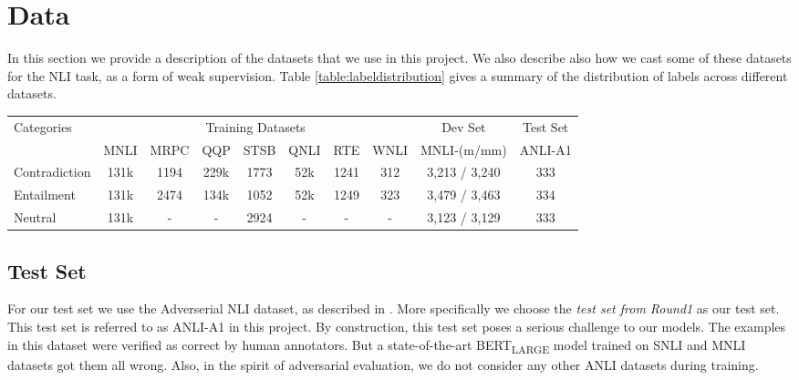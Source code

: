 \section{Data}
\label{sec:data}


In this section we provide a description of the datasets that we use in this project. We also describe also how we cast some of these datasets for the NLI task, as a form of weak supervision. Table \ref{table:labeldistribution} gives a summary of the distribution of labels across different datasets.

\begin{table*}
\small
\centering
\begin{tabular}{l ccccccc | c c}

\toprule
Categories
                                        & \multicolumn{7}{c|}{Training Datasets} 
                                        & \multicolumn{1}{c}{Dev Set}   
                                        & \multicolumn{1}{c}{Test Set} \\ 
                                        
																				& MNLI      & MRPC  	& QQP				&STSB				&QNLI    		& RTE				& WNLI   	& MNLI-(m/mm)   	& ANLI-A1  \\
\midrule

Contradiction														& 131k			& 1194 		& 229k 			& 1773			& 52k 			& 1241			& 312			& 3,213 / 3,240   & 333 \\
Entailment   								 		    		& 131k  		& 2474 		& 134k 			& 1052			& 52k				& 1249			& 323			& 3,479 / 3,463   & 334 \\
Neutral    															& 131k  		& - 			& - 				& 2924			& -					& -					& -				& 3,123 / 3,129   & 333 \\

\bottomrule
\end{tabular}

\caption{\label{table:labeldistribution} Distribution of labels across different datasets}
\end{table*}

\subsection{Test Set}
\label{subsec:testset}

For our test set we use the Adverserial NLI dataset, as described in \cite{nie2019adversarial}. More specifically we choose the \textit{test set from Round1} as our test set. This test set is referred to as ANLI-A1 in this project. By construction, this test set poses a serious challenge to our models. The examples in this dataset were verified as correct by human annotators. But a state-of-the-art BERT\textsubscript{LARGE} model trained on SNLI \cite{bowman2015large} and MNLI \cite{williams2017broad} datasets got them all wrong. Also, in the spirit of adversarial evaluation, we do not consider any other ANLI datasets during training. 

